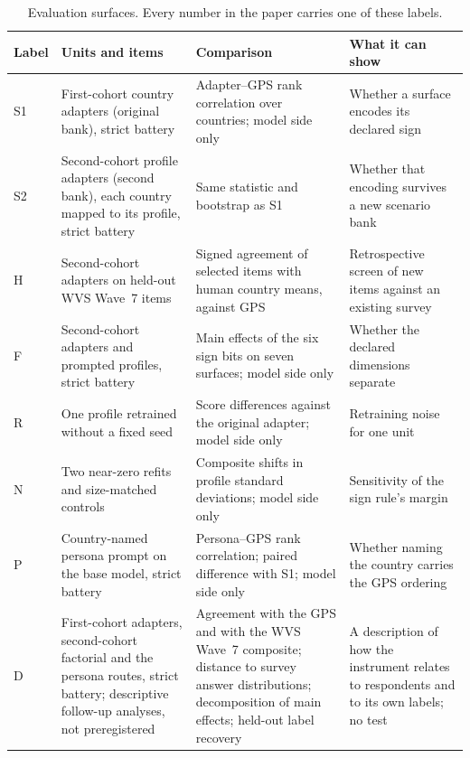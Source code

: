 \begin{table}[htbp]
\centering
\caption{Evaluation surfaces. Every number in the paper carries one of these labels.}\label{tab:surfaces}
\small
\renewcommand{\arraystretch}{1.15}
\begin{tabularx}{\textwidth}{@{}l>{\raggedright\arraybackslash}X>{\raggedright\arraybackslash}X>{\raggedright\arraybackslash}p{}@{}}
\toprule
Label & Units and items & Comparison & What it can show \\
\midrule
S1 & First-cohort country adapters (original bank), strict battery & Adapter--GPS rank correlation over countries; model side only & Whether a surface encodes its declared sign \\
S2 & Second-cohort profile adapters (second bank), each country mapped to its profile, strict battery & Same statistic and bootstrap as S1 & Whether that encoding survives a new scenario bank \\
H & Second-cohort adapters on held-out WVS Wave~7 items & Signed agreement of selected items with human country means, against GPS & Retrospective screen of new items against an existing survey \\
F & Second-cohort adapters and prompted profiles, strict battery & Main effects of the six sign bits on seven surfaces; model side only & Whether the declared dimensions separate \\
R & One profile retrained without a fixed seed & Score differences against the original adapter; model side only & Retraining noise for one unit \\
N & Two near-zero refits and size-matched controls & Composite shifts in profile standard deviations; model side only & Sensitivity of the sign rule's margin \\
P & Country-named persona prompt on the base model, strict battery & Persona--GPS rank correlation; paired difference with S1; model side only & Whether naming the country carries the GPS ordering \\
D & First-cohort adapters, second-cohort factorial and the persona routes, strict battery; descriptive follow-up analyses, not preregistered & Agreement with the GPS and with the WVS Wave~7 composite; distance to survey answer distributions; decomposition of main effects; held-out label recovery & A description of how the instrument relates to respondents and to its own labels; no test \\
\bottomrule
\end{tabularx}
\end{table}

